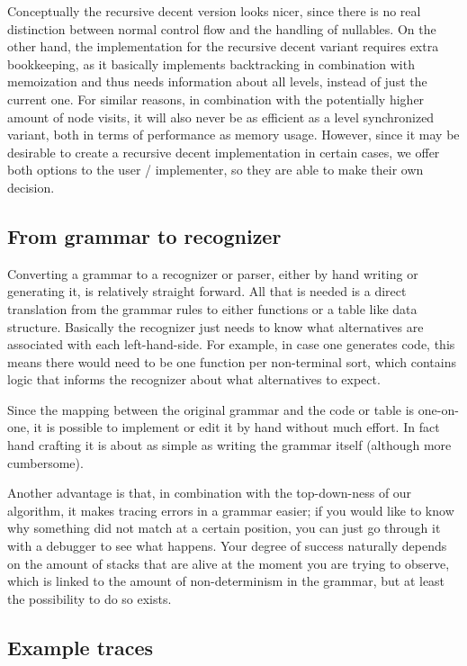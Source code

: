 \documentclass[a4paper,10pt]{article}
\begin{document}
Conceptually the recursive decent version looks nicer, since there is no real distinction between normal control flow and the handling of nullables. On the other hand, the implementation for the recursive decent variant requires extra bookkeeping, as it basically implements backtracking in combination with memoization and thus needs information about all levels, instead of just the current one. For similar reasons, in combination with the potentially higher amount of node visits, it will also never be as efficient as a level synchronized variant, both in terms of performance as memory usage. However, since it may be desirable to create a recursive decent implementation in certain cases, we offer both options to the user / implementer, so they are able to make their own decision.

\subsection{From grammar to recognizer}

Converting a grammar to a recognizer or parser, either by hand writing or generating it, is relatively straight forward. All that is needed is a direct translation from the grammar rules to either functions or a table like data structure. Basically the recognizer just needs to know what alternatives are associated with each left-hand-side. For example, in case one generates code, this means there would need to be one function per non-terminal sort, which contains logic that informs the recognizer about what alternatives to expect.

Since the mapping between the original grammar and the code or table is one-on-one, it is possible to implement or edit it by hand without much effort. In fact hand crafting it is about as simple as writing the grammar itself (although more cumbersome).

Another advantage is that, in combination with the top-down-ness of our algorithm, it makes tracing errors in a grammar easier; if you would like to know why something did not match at a certain position, you can just go through it with a debugger to see what happens. Your degree of success naturally depends on the amount of stacks that are alive at the moment you are trying to observe, which is linked to the amount of non-determinism in the grammar, but at least the possibility to do so exists.

\subsection{Example traces}
\end{document}
